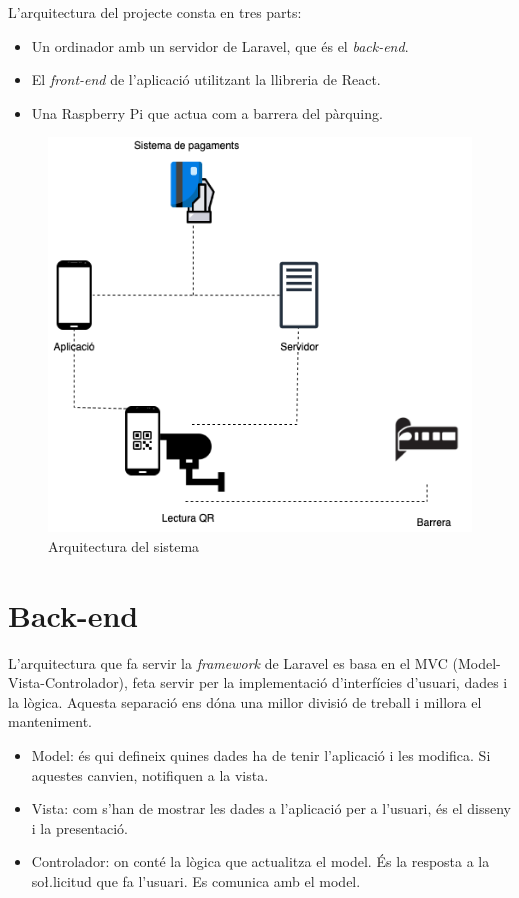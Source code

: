 L'arquitectura del projecte consta en tres parts:
\begin{itemize}
    \item Un ordinador amb un servidor de Laravel, que és el \emph{back-end}.
    \item El \emph{front-end} de l'aplicació utilitzant la llibreria de React.
    \item Una Raspberry Pi que actua com a barrera del pàrquing.
\end{itemize}

\begin{figure}[H]
    \begin{center}
        \includegraphics[scale=0.60]{Fotos/arquitectura_sistema.png}
    \end{center}
    \caption{Arquitectura del sistema}
    \label{fig:compiler_phases}
\end{figure}

\newpage
\section{Back-end}

L'arquitectura que fa servir la \emph{framework} de Laravel es basa en el MVC (Model-Vista-Controlador),
feta servir per la implementació d'interfícies d'usuari, dades i la lògica.
Aquesta separació ens dóna una millor divisió de treball i millora el manteniment.
\begin{itemize}
    \item Model: és qui defineix quines dades ha de tenir l'aplicació i les modifica. Si aquestes canvien, notifiquen a la vista.
    \item Vista: com s'han de mostrar les dades a l'aplicació per a l'usuari, és el disseny i la presentació.
    \item Controlador: on conté la lògica que actualitza el model. És la resposta a la so\l.licitud que fa l'usuari.
    Es comunica amb el model.
\end{itemize}

